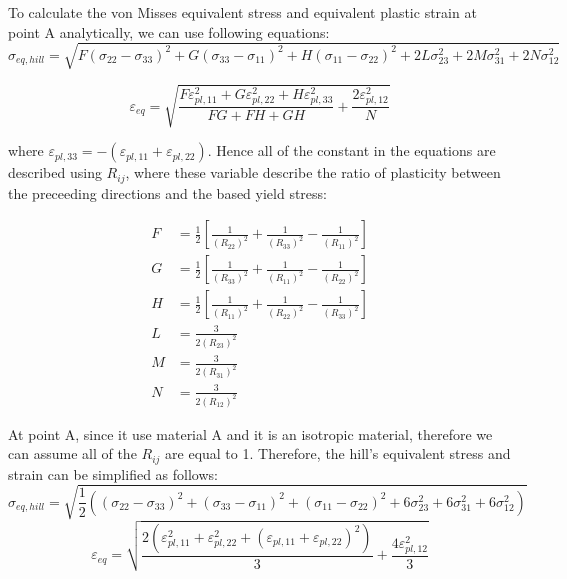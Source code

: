 \documentclass[12pt]{article}
\begin{document}
To calculate the von Misses equivalent stress and equivalent plastic strain at point A analytically, 
we can use following equations:
\begin{equation}
    \sigma_{eq, hill} = \sqrt{
        F(\sigma_{22}-\sigma_{33})^2 + 
        G(\sigma_{33}-\sigma_{11})^2 + 
        H(\sigma_{11}-\sigma_{22})^2 + 
        2L\sigma_{23}^2 + 
        2M\sigma_{31}^2 + 
        2N\sigma_{12}^2
    }
    \label{eq:hill_yield}
\end{equation}

\begin{equation}
    \varepsilon_{eq} = \sqrt{\frac{F\varepsilon_{pl,11}^2 + G\varepsilon_{pl,22}^2 + H\varepsilon_{pl,33}^2}{FG+FH+GH} + \frac{2\varepsilon_{pl,12}^2}{N}}
    \label{eq:equivalent_plastic_strain}
\end{equation}

where $\varepsilon_{pl,33}=-(\varepsilon_{pl,11}+\varepsilon_{pl,22})$. Hence all of the constant in the equations
are described using $R_{ij}$, where these variable describe the ratio of plasticity between the preceeding directions and the based
yield stress:

\begin{align*}
F &= \frac{1}{2} \left[ \frac{1}{(R_{22})^2} + \frac{1}{(R_{33})^2} - \frac{1}{(R_{11})^2} \right] \\
G &= \frac{1}{2} \left[ \frac{1}{(R_{33})^2} + \frac{1}{(R_{11})^2} - \frac{1}{(R_{22})^2} \right] \\
H &= \frac{1}{2} \left[ \frac{1}{(R_{11})^2} + \frac{1}{(R_{22})^2} - \frac{1}{(R_{33})^2} \right] \\
L &= \frac{3}{2(R_{23})^2} \\
M &= \frac{3}{2(R_{31})^2} \\
N &= \frac{3}{2(R_{12})^2}
\end{align*}

At point A, since it use material A and it is an isotropic material, 
therefore we can assume all of the $R_{ij}$ are equal to 1. Therefore, the hill's
equivalent stress and strain can be simplified as follows:
\begin{equation}
    \sigma_{eq, hill} = \sqrt{\frac{1}{2}((\sigma_{22}-\sigma_{33})^2 + (\sigma_{33}-\sigma_{11})^2 + (\sigma_{11}-\sigma_{22})^2 + 6\sigma_{23}^2 + 6\sigma_{31}^2 + 6\sigma_{12}^2)}
\end{equation}
\begin{equation}
    \varepsilon_{eq} = \sqrt{\frac{2(\varepsilon_{pl,11}^2 + \varepsilon_{pl,22}^2 + (\varepsilon_{pl,11}+\varepsilon_{pl,22})^2)}{3} + \frac{4\varepsilon_{pl,12}^2}{3}}
\end{equation}
\end{document}
